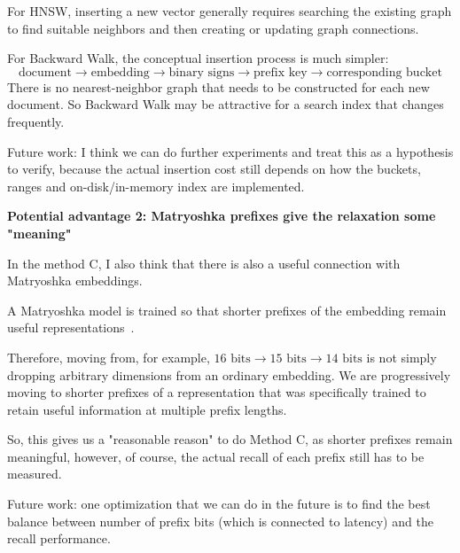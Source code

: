 For HNSW, inserting a new vector generally requires searching the existing graph to find
suitable neighbors and then creating or updating graph connections.

For Backward Walk, the conceptual insertion process is much simpler:
\[
\text{document}\to\text{embedding}\to\text{binary signs}\to\text{prefix key}\to\text{corresponding bucket}
\]
There is no nearest-neighbor graph that needs to be constructed for each new document.
So Backward Walk may be attractive for a search index that changes frequently.

Future work: I think we can do further experiments and treat this as a hypothesis to verify, because the actual insertion cost still
depends on how the buckets, ranges and on-disk/in-memory index are implemented.

\textbf{Potential advantage 2: Matryoshka prefixes give the relaxation some "meaning"}\par
In the method C, I also think that there is also a useful connection with Matryoshka embeddings.

A Matryoshka model is trained so that shorter prefixes of the embedding remain useful
representations~\cite{mrl}.

Therefore, moving from, for example, $16\text{ bits}\to15\text{ bits}\to14\text{ bits}$
is not simply dropping arbitrary dimensions from an ordinary embedding. We are progressively
moving to shorter prefixes of a representation that was specifically trained to retain
useful information at multiple prefix lengths.

So, this gives us a "reasonable reason" to do Method C, as shorter prefixes remain meaningful, however, of course, the actual recall of each prefix still has to be measured.

Future work: one optimization that we can do in the future is to find the best balance between number of prefix bits (which is connected to latency) and the recall performance.
